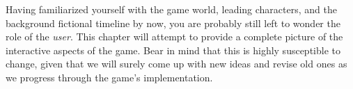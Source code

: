 
Having familiarized yourself with the game world, leading characters, and the background fictional timeline by now, you are probably still left to wonder the role of the {\it user}. This chapter will attempt to provide a complete picture of the interactive aspects of the game. Bear in mind that this is highly susceptible to change, given that we will surely come up with new ideas and revise old ones as we progress through the game's implementation.




%

\StopChapter

